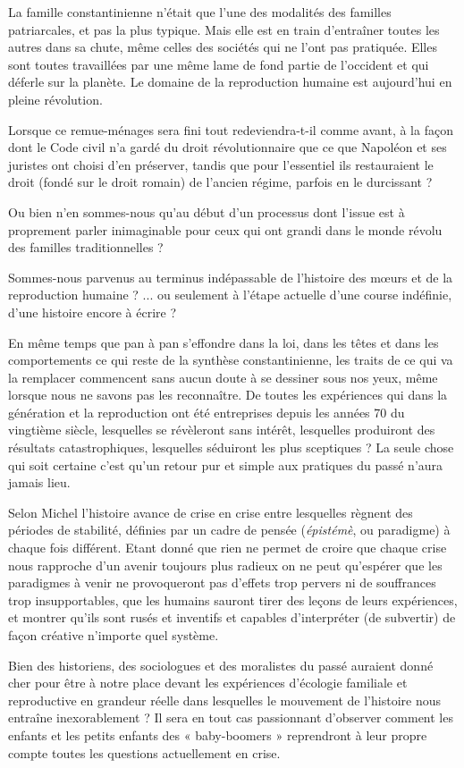  La famille constantinienne n'était que l'une des modalités des familles patriarcales, et pas la plus typique. Mais elle est en train d'entraîner toutes les autres dans sa chute, même celles des sociétés qui ne l'ont pas pratiquée. Elles sont toutes travaillées par une même lame de fond partie de l'occident et qui déferle sur la planète. Le domaine de la reproduction humaine est aujourd'hui en pleine révolution.
  
 Lorsque ce remue-ménages sera fini tout redeviendra-t-il comme avant, à la façon dont le Code civil n'a gardé du droit révolutionnaire que ce que Napoléon et ses juristes ont choisi d'en préserver, tandis que pour l'essentiel ils restauraient le droit (fondé sur le droit romain) de l'ancien régime, parfois en le durcissant ? 
 
 Ou bien n'en sommes-nous qu'au début d'un processus dont l'issue est à proprement parler inimaginable pour ceux qui ont grandi dans le monde révolu des familles traditionnelles ?

 Sommes-nous parvenus au terminus indépassable de l'histoire des mœurs et de la reproduction humaine ? ... ou seulement à l'étape actuelle d'une course indéfinie, d'une histoire encore à écrire ? 
 
 

 En même temps que pan à pan s'effondre dans la loi, dans les têtes et dans les comportements ce qui reste de la synthèse constantinienne, les traits de ce qui va la remplacer commencent sans aucun doute à se dessiner sous nos yeux, même lorsque nous ne savons pas les reconnaître. De toutes les expériences qui dans la génération et la reproduction ont été entreprises depuis les années 70 du vingtième siècle, lesquelles se révèleront sans intérêt, lesquelles produiront des résultats catastrophiques, lesquelles séduiront les plus sceptiques ?  La seule chose qui soit certaine c'est qu'un retour pur et simple aux pratiques du passé n'aura jamais lieu. 
 
 Selon Michel  l'histoire avance de crise en crise entre lesquelles règnent des périodes de stabilité, définies par un cadre de pensée (\emph{épistémè}, ou paradigme) à chaque fois différent. Etant donné que rien ne permet de croire que chaque crise nous rapproche d'un avenir toujours plus radieux on ne peut qu'espérer que les paradigmes à venir ne provoqueront pas d'effets trop pervers ni de souffrances trop insupportables, que les humains sauront tirer des leçons de leurs expériences, et montrer qu'ils sont rusés et inventifs et capables d'interpréter (de subvertir) de façon créative n'importe quel système.

Bien des historiens, des sociologues et des moralistes du passé auraient donné cher pour être à notre place devant les expériences d'écologie familiale et reproductive en grandeur réelle dans lesquelles le mouvement de l'histoire nous entraîne inexorablement ? Il sera en tout cas passionnant d'observer comment les enfants et les petits enfants des « baby-boomers » reprendront à leur propre compte toutes les questions actuellement en crise.


